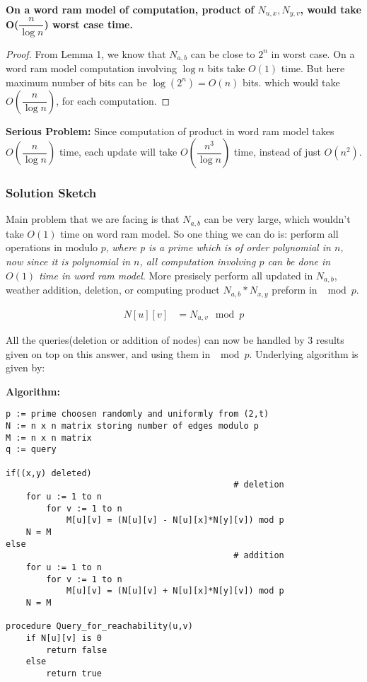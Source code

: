 \documentclass[a4paper]{article}
\begin{document}
\begin{warn}[Result:] 
\textbf{On a word ram model of computation, product of $N_{u,x}, N_{y,v}$, would take O($\dfrac{n}{\log n}$)
worst case time.}
\end{warn}
\begin{proof}
From Lemma 1, we know that $N_{a,b}$ can be close to $2^n$ in worst case. On a word ram model computation involving
$\log n$ bits take $O(1)$ time. But here maximum number of bits can be $\log (2^n) = O(n)$ bits. which would take
$O(\dfrac{n}{\log n})$, for each computation.
\end{proof}

\textbf{Serious Problem:} Since computation of product in word ram model takes $O(\dfrac{n}{\log n})$ time, each update
will take $O(\dfrac{n^3}{\log n})$ time, instead of just $O(n^2)$.

\subsubsection*{Solution Sketch}
Main problem that we are facing is that $N_{a,b}$ can be very large, which wouldn't take $O(1)$ time on word ram model.
So one thing we can do is: perform all operations in modulo $p$, \textit{where p is a prime which is of order
polynomial in $n$, now since it is polynomial in $n$, all computation involving $p$ can be done in $O(1)$ time in word ram model}. More presisely perform all updated in $N_{a,b}$, weather addition, deletion, or computing product $N_{a,b}*N_{x,y}$
preform in $\mod p$.
\begin{warn}[Note:]
\begin{align*}
N[u][v] & = N_{u,v} \mod p
\end{align*}
\end{warn}
All the queries(deletion or addition of nodes) can now be handled by 3 results given on top on this answer, and using them in $\mod p$. Underlying algorithm is given by:

\textbf{Algorithm:}
\begin{lstlisting}[columns=fullflexible]
p := prime choosen randomly and uniformly from (2,t)
N := n x n matrix storing number of edges modulo p
M := n x n matrix
q := query

if((x,y) deleted)
                                             # deletion
    for u := 1 to n
        for v := 1 to n
            M[u][v] = (N[u][v] - N[u][x]*N[y][v]) mod p
    N = M
else
                                             # addition
    for u := 1 to n
        for v := 1 to n
            M[u][v] = (N[u][v] + N[u][x]*N[y][v]) mod p
    N = M

procedure Query_for_reachability(u,v)
    if N[u][v] is 0
        return false
    else
        return true
\end{lstlisting}
\end{document}
